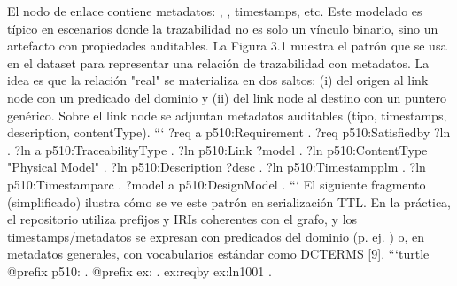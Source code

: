 \markdownRendererUlItem El nodo de enlace contiene metadatos: , , timestamps, etc.\markdownRendererUlItemEnd 
\markdownRendererUlEndTight \markdownRendererInterblockSeparator
{}Este modelado es típico en escenarios donde la trazabilidad no es solo un vínculo binario, sino un artefacto con propiedades auditables.\markdownRendererInterblockSeparator
{}\markdownRendererInterblockSeparator
{}La Figura 3.1 muestra el patrón que se usa en el dataset para representar una relación de trazabilidad con metadatos. La idea es que la relación "real" se materializa en dos saltos: (i) del origen al link node con un predicado del dominio y (ii) del link node al destino con un puntero genérico. Sobre el link node se adjuntan metadatos auditables (tipo, timestamps, description, contentType).\markdownRendererInterblockSeparator
{}``` ?req a p510:Requirement . ?req p510:Satisfied\markdownRendererUnderscore{}by ?ln .\markdownRendererInterblockSeparator
{}?ln a p510:TraceabilityType . ?ln p510:Link ?model . ?ln p510:ContentType "Physical Model" . ?ln p510:Description ?desc . ?ln p510:Timestampplm . ?ln p510:Timestamparc .\markdownRendererInterblockSeparator
{}?model a p510:DesignModel . ```\markdownRendererInterblockSeparator
{} El siguiente fragmento (simplificado) ilustra cómo se ve este patrón en serialización TTL. En la práctica, el repositorio utiliza prefijos y IRIs coherentes con el grafo, y los timestamps/metadatos se expresan con predicados del dominio (p. ej. ) o, en metadatos generales, con vocabularios estándar como DCTERMS [9].\markdownRendererInterblockSeparator
{}```turtle @prefix p510:  . @prefix ex:  .\markdownRendererInterblockSeparator
{}ex:reqby ex:ln\markdownRendererUnderscore{}1001 .\markdownRendererInterblockSeparator

